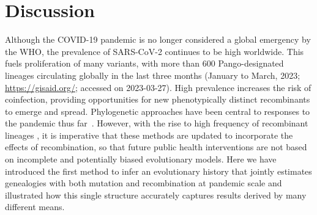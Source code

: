 \documentclass{article}
\begin{document}
\section{Discussion}
Although the COVID-19 pandemic is no longer considered a global emergency
by the WHO, the prevalence of SARS-CoV-2 continues to be high worldwide. This fuels
proliferation of many variants, with more than 600 Pango-designated lineages
circulating globally in the last three months (January to March, 2023;
\url{https://gisaid.org/}; accessed on 2023-03-27).
High prevalence increases the risk of coinfection,
providing opportunities for new phenotypically
distinct recombinants to emerge and spread. Phylogenetic approaches have
been central to responses to the pandemic thus
far~\citep{Attwood2022-ab,Bloom2023-fitness,Abbas2022-reconstruction,
Mclaughlin2022-genomic}.
However, with the rise to high frequency of recombinant
lineages \citep[e.g.\ XBB;][]{Tamura2023-ab},
it is imperative that these methods are updated to incorporate the
effects of recombination, so that future public health interventions are
not based on incomplete and potentially biased evolutionary models.
Here we have introduced the first method to infer an evolutionary
history that jointly estimates genealogies with both mutation and
recombination at pandemic scale and illustrated how this single
structure accurately captures results derived by many different means.
\end{document}
